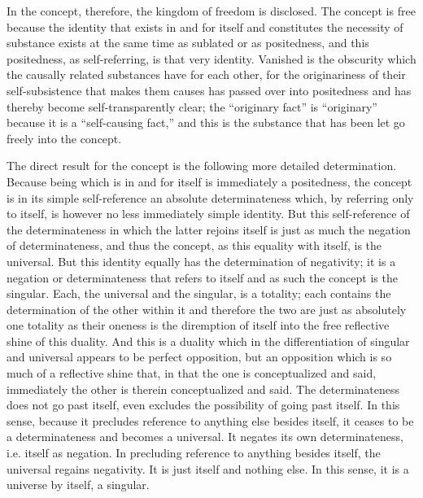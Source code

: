 In the concept, therefore,
the kingdom of freedom is disclosed.
The concept is free because the identity
that exists in and for itself
and constitutes the necessity of substance
exists at the same time as sublated or as positedness,
and this positedness, as self-referring, is that very identity.
Vanished is the obscurity which the causally related
substances have for each other,
for the originariness of their self-subsistence
that makes them causes has passed over into positedness
and has thereby become self-transparently clear;
the “originary fact” is “originary” because
it is a “self-causing fact,”
and this is the substance that has been
let go freely into the concept.

The direct result for the concept is
the following more detailed determination.
Because being which is in and for itself is
immediately a positedness,
the concept is in its simple self-reference
an absolute determinateness
which, by referring only to itself, is
however no less immediately simple identity.
But this self-reference of the determinateness
in which the latter rejoins itself
is just as much the negation of determinateness,
and thus the concept, as this equality with itself, is the universal.
But this identity equally has the determination of negativity;
it is a negation or determinateness that refers to itself
and as such the concept is the singular.
Each, the universal and the singular, is a totality;
each contains the determination of the other within it
and therefore the two are just as absolutely one totality
as their oneness is the diremption of itself into
the free reflective shine of this duality.
And this is a duality which in the differentiation
of singular and universal appears to be perfect opposition,
but an opposition which is so much of a reflective shine that,
in that the one is conceptualized and said,
immediately the other is therein conceptualized and said.
The determinateness does not go past itself,
even excludes the possibility of going past itself.
In this sense, because it precludes reference
to anything else besides itself,
it ceases to be a determinateness
and becomes a universal.
It negates its own determinateness,
i.e. itself as negation.
In precluding reference to anything besides itself,
the universal regains negativity.
It is just itself and nothing else.
In this sense, it is a universe by itself, a singular.

